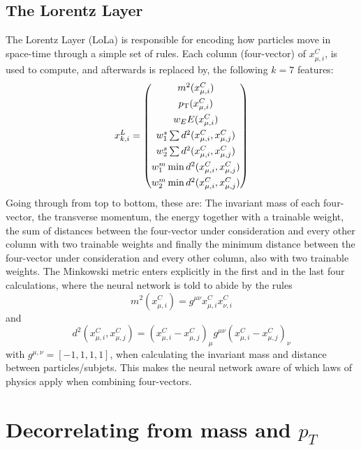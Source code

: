 \subsection{The Lorentz Layer}
The Lorentz Layer (LoLa) is responsible for encoding how particles move in space-time through a simple set of rules. Each column (four-vector) of $x_{\mu,i}^{C}$, is used to compute, and afterwards is replaced by, the following $k=7$ features:
\begin{equation}
  x_{k,i}^{L} = \begin{pmatrix}
  m^2  (x_{\mu,i}^{C})                       \\[1ex]
  p_{\mathrm{T}}  (x_{\mu,i}^{C})                       \\[1ex]
  w_E E(x_{\mu,i}^{C})                       \\[1ex]
  w^s_1\sum d^2(x_{\mu,i}^{C},x_{\mu,j}^{C}) \\[1ex]
  w^s_2\sum d^2(x_{\mu,i}^{C},x_{\mu,j}^{C}) \\[1ex]
  w^m_1\min d^2(x_{\mu,i}^{C},x_{\mu,j}^{C}) \\[1ex]
  w^m_2\min d^2(x_{\mu,i}^{C},x_{\mu,j}^{C}) 
  \end{pmatrix}
\end{equation}
Going through from top to bottom, these are: The invariant mass of each four-vector, the transverse momentum, the energy together with a trainable weight, the sum of distances between the four-vector under consideration and every other column with two trainable weights and finally the minimum distance between the four-vector under consideration and every other column, also with two trainable weights. The Minkowski metric enters explicitly in the first and in the last four calculations, where the neural network is told to abide by the rules
\begin{equation}
  m^2 (x_{\mu,i}^{C}) = g^{\mu\nu}x_{\mu,i}^{C}x_{\nu,i}^{C}
\end{equation}
and
\begin{equation}
  d^2 (x_{\mu,i}^{C},x_{\mu,j}^{C}) = (x_{\mu,i}^{C}-x_{\mu,j}^{C})_{\mu} g^{\mu\nu} (x_{\mu,i}^{C}-x_{\mu,j}^{C})_{\nu}
\end{equation}
with $g^{\mu,\nu}=[-1,1,1,1]$, when calculating the invariant mass and distance between particles/subjets. This makes the neural network aware of which laws of physics apply when combining four-vectors.  
\section{Decorrelating from mass and $p_{T}$}
